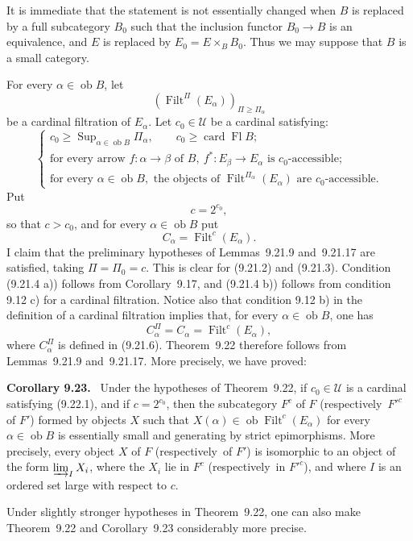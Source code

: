 \documentclass[11pt]{article}
\newcommand{\U}{\mathcal{U}}
\newcommand{\ob}{\operatorname{ob}}
\newcommand{\Filt}{\operatorname{Filt}}
\newcommand{\Sup}{\operatorname{Sup}}
\newcommand{\card}{\operatorname{card}}
\newcommand{\Fl}{\operatorname{Fl}}
\newcommand{\resp}{respectively\ }
\newenvironment{statement}[1]{\par\medskip\noindent\textbf{#1.}\ }{\par\medskip}
\begin{document}
It is immediate that the statement is not essentially changed when $B$ is replaced by a full subcategory $B_0$ such that the inclusion functor $B_0\to B$ is an equivalence, and $E$ is replaced by $E_0=E\times_B B_0$. Thus we may suppose that $B$ is a small category.

For every $\alpha\in\ob B$, let
\[
(\Filt^\Pi(E_\alpha))_{\Pi\geq\Pi_\alpha}
\]
be a cardinal filtration of $E_\alpha$. Let $c_0\in\U$ be a cardinal satisfying:
\begin{equation}
\begin{cases}
c_0\geq \displaystyle\Sup_{\alpha\in\ob B}\Pi_\alpha,\qquad
c_0\geq \card\Fl B;\\
\text{for every arrow }f:\alpha\to\beta\text{ of }B,\ 
f^\ast:E_\beta\to E_\alpha\text{ is }c_0\text{-accessible;}\\
\text{for every }\alpha\in\ob B,\text{ the objects of }
\Filt^{\Pi_\alpha}(E_\alpha)\text{ are }c_0\text{-accessible.}
\end{cases}
\tag{9.22.1}
\end{equation}
Put
\[
 c=2^{c_0},
\]
so that $c>c_0$, and for every $\alpha\in\ob B$ put
\[
 C_\alpha=\Filt^c(E_\alpha).
\]
I claim that the preliminary hypotheses of Lemmas~9.21.9 and~9.21.17 are satisfied, taking $\Pi=\Pi_0=c$. This is clear for (9.21.2) and (9.21.3). Condition (9.21.4 a)) follows from Corollary~9.17, and (9.21.4 b)) follows from condition 9.12 c) for a cardinal filtration. Notice also that condition 9.12 b) in the definition of a cardinal filtration implies that, for every $\alpha\in\ob B$, one has
\[
 C^\Pi_\alpha=C_\alpha=\Filt^c(E_\alpha),
\]
where $C^\Pi_\alpha$ is defined in (9.21.6). Theorem~9.22 therefore follows from Lemmas~9.21.9 and~9.21.17. More precisely, we have proved:

\begin{statement}{Corollary 9.23}
Under the hypotheses of Theorem~9.22, if $c_0\in\U$ is a cardinal satisfying (9.22.1), and if $c=2^{c_0}$, then the subcategory $F^c$ of $F$ (\resp ${F'}^c$ of $F'$) formed by objects $X$ such that $X(\alpha)\in\ob\Filt^c(E_\alpha)$ for every $\alpha\in\ob B$ is essentially small and generating by strict epimorphisms. More precisely, every object $X$ of $F$ (\resp of $F'$) is isomorphic to an object of the form $\varinjlim_I X_i$, where the $X_i$ lie in $F^c$ (\resp in ${F'}^c$), and where $I$ is an ordered set large with respect to $c$.
\end{statement}

Under slightly stronger hypotheses in Theorem~9.22, one can also make Theorem~9.22 and Corollary~9.23 considerably more precise.
\end{document}
